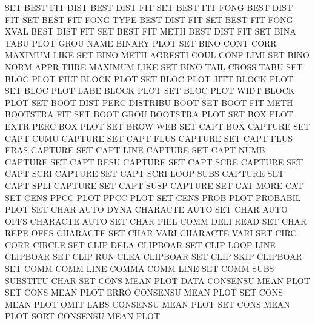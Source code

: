 SET      BEST FIT  DIST                 BEST     DIST FIT
SET      BEST FIT  FONG                 BEST     DIST FIT
SET      BEST FIT  FONG TYPE            BEST     DIST FIT
SET      BEST FIT  FONG XVAL            BEST     DIST FIT
SET      BEST FIT  METH                 BEST     DIST FIT
SET      BINA TABU PLOT GROU NAME       BINARY   PLOT
SET      BINO CONT CORR                 MAXIMUM  LIKE
SET      BINO METH                      AGRESTI  COUL CONF LIMI
SET      BINO NORM APPR THRE            MAXIMUM  LIKE
SET      BINO TAIL                      CROSS    TABU
SET      BLOC PLOT FILT                 BLOCK    PLOT
SET      BLOC PLOT JITT                 BLOCK    PLOT
SET      BLOC PLOT LABE                 BLOCK    PLOT
SET      BLOC PLOT WIDT                 BLOCK    PLOT
SET      BOOT DIST PERC                 DISTRIBU BOOT
SET      BOOT FIT  METH                 BOOTSTRA FIT
SET      BOOT GROU                      BOOTSTRA PLOT
SET      BOX  PLOT EXTR PERC            BOX      PLOT
SET      BROW                           WEB
SET      CAPT BOX                       CAPTURE
SET      CAPT CUMU                      CAPTURE
SET      CAPT FLUS                      CAPTURE
SET      CAPT FLUS ERAS                 CAPTURE
SET      CAPT LINE                      CAPTURE
SET      CAPT NUMB                      CAPTURE
SET      CAPT RESU                      CAPTURE
SET      CAPT SCRE                      CAPTURE
SET      CAPT SCRI                      CAPTURE
SET      CAPT SCRI LOOP SUBS            CAPTURE
SET      CAPT SPLI                      CAPTURE
SET      CAPT SUSP                      CAPTURE
SET      CAT  MORE                      CAT
SET      CENS PPCC PLOT                 PPCC     PLOT
SET      CENS PROB PLOT                 PROBABIL PLOT
SET      CHAR AUTO DYNA                 CHARACTE AUTO
SET      CHAR AUTO OFFS                 CHARACTE AUTO
SET      CHAR FIEL COMM DELI            READ
SET      CHAR REPE OFFS                 CHARACTE
SET      CHAR VARI                      CHARACTE VARI
SET      CIRC CORR                      CIRCLE
SET      CLIP DELA                      CLIPBOAR
SET      CLIP LOOP LINE                 CLIPBOAR
SET      CLIP RUN  CLEA                 CLIPBOAR
SET      CLIP SKIP                      CLIPBOAR
SET      COMM COMM LINE                 COMMA    COMM LINE
SET      COMM SUBS                      SUBSTITU CHAR
SET      CONS MEAN PLOT DATA            CONSENSU MEAN PLOT
SET      CONS MEAN PLOT ERRO            CONSENSU MEAN PLOT
SET      CONS MEAN PLOT OMIT LABS       CONSENSU MEAN PLOT
SET      CONS MEAN PLOT SORT            CONSENSU MEAN PLOT

